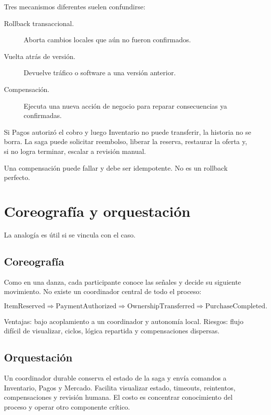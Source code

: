\documentclass[variant=apuntes,cover=institutional,mode=screen]{ua-engineering-v6-article}
\begin{document}
Tres mecanismos diferentes suelen confundirse:

\begin{description}
\item[Rollback transaccional.] Aborta cambios locales que aún no fueron confirmados.
\item[Vuelta atrás de versión.] Devuelve tráfico o software a una versión anterior.
\item[Compensación.] Ejecuta una nueva acción de negocio para reparar consecuencias ya confirmadas.
\end{description}

Si Pagos autorizó el cobro y luego Inventario no puede transferir, la historia no se borra. La saga puede solicitar reembolso, liberar la reserva, restaurar la oferta y, si no logra terminar, escalar a revisión manual.

Una compensación puede fallar y debe ser idempotente. No es un rollback perfecto.

\section{Coreografía y orquestación}

La analogía es útil si se vincula con el caso.

\subsection{Coreografía}

Como en una danza, cada participante conoce las señales y decide su siguiente movimiento. No existe un coordinador central de todo el proceso:

\[
\text{ItemReserved}\Rightarrow\text{PaymentAuthorized}\Rightarrow
\text{OwnershipTransferred}\Rightarrow\text{PurchaseCompleted}.
\]

Ventajas: bajo acoplamiento a un coordinador y autonomía local. Riesgos: flujo difícil de visualizar, ciclos, lógica repartida y compensaciones dispersas.

\subsection{Orquestación}

Un coordinador durable conserva el estado de la saga y envía comandos a Inventario, Pagos y Mercado. Facilita visualizar estado, timeouts, reintentos, compensaciones y revisión humana. El costo es concentrar conocimiento del proceso y operar otro componente crítico.
\end{document}

